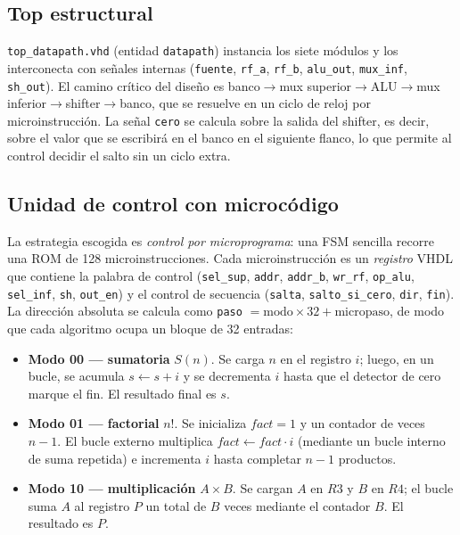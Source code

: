 \documentclass[llncs]{llncs}
\begin{document}
\subsection{Top estructural}

\texttt{top\_datapath.vhd} (entidad \texttt{datapath}) instancia los siete
módulos y los interconecta con señales internas (\texttt{fuente},
\texttt{rf\_a}, \texttt{rf\_b}, \texttt{alu\_out}, \texttt{mux\_inf},
\texttt{sh\_out}). El camino crítico del diseño es
banco$\rightarrow$mux superior$\rightarrow$ALU$\rightarrow$mux inferior$
\rightarrow$shifter$\rightarrow$banco, que se resuelve en un ciclo de reloj
por microinstrucción. La señal \texttt{cero} se calcula sobre la salida del
shifter, es decir, sobre el valor que se escribirá en el banco en el
siguiente flanco, lo que permite al control decidir el salto sin un ciclo
extra.

\subsection{Unidad de control con microcódigo}

La estrategia escogida es \emph{control por microprograma}: una FSM sencilla
recorre una ROM de 128 microinstrucciones. Cada microinstrucción es un
\emph{registro} VHDL que contiene la palabra de control
(\texttt{sel\_sup}, \texttt{addr}, \texttt{addr\_b}, \texttt{wr\_rf},
\texttt{op\_alu}, \texttt{sel\_inf}, \texttt{sh},
\texttt{out\_en}) y el control de secuencia (\texttt{salta},
\texttt{salto\_si\_cero}, \texttt{dir}, \texttt{fin}). La dirección absoluta
se calcula como \texttt{paso} $= \mathrm{modo}\times 32 + \mathrm{micropaso}$,
de modo que cada algoritmo ocupa un bloque de 32 entradas:

\begin{itemize}
  \item \textbf{Modo 00 --- sumatoria} $S(n)$. Se carga $n$ en el registro
  $i$; luego, en un bucle, se acumula $s \leftarrow s + i$ y se decrementa
  $i$ hasta que el detector de cero marque el fin. El resultado final es
  $s$.
  \item \textbf{Modo 01 --- factorial} $n!$. Se inicializa $fact=1$ y un
  contador de veces $n-1$. El bucle externo multiplica $fact \leftarrow
  fact \cdot i$ (mediante un bucle interno de suma repetida) e incrementa
  $i$ hasta completar $n-1$ productos.
  \item \textbf{Modo 10 --- multiplicación} $A\times B$. Se cargan $A$ en
  $R3$ y $B$ en $R4$; el bucle suma $A$ al registro $P$ un total de $B$
  veces mediante el contador $B$. El resultado es $P$.
\end{itemize}
\end{document}
